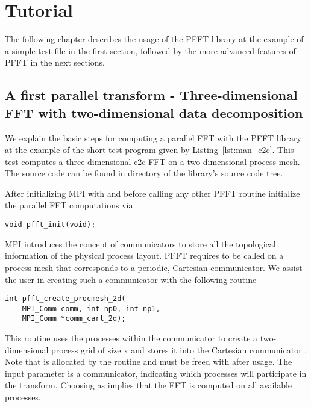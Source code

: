\chapter{Tutorial}\label{chap:tuto}

The following chapter describes the usage of the PFFT library at the example of a simple test file in the first section,
followed by the more advanced features of PFFT in the next sections.

\section{A first parallel transform - Three-dimensional FFT with two-dimensional data decomposition}
We explain the basic steps for computing a parallel FFT with the PFFT library at the example
of the short test program given by Listing~\ref{lst:man_c2c}. This test computes a three-dimensional c2c-FFT on
a two-dimensional process mesh. The source code  can be found in directory 
of the library's source code tree. 


After initializing MPI with  and before calling any other PFFT routine initialize
the parallel FFT computations via
\begin{lstlisting}
void pfft_init(void);
\end{lstlisting}
MPI introduces the concept of communicators to store all the topological information of the physical process layout.
PFFT requires to be called on a process mesh that corresponds to a periodic, Cartesian communicator.
We assist the user in creating such a communicator with the following routine
\begin{lstlisting}
int pfft_create_procmesh_2d(
    MPI_Comm comm, int np0, int np1,
    MPI_Comm *comm_cart_2d);
\end{lstlisting}
This routine uses the processes within the communicator  to create a two-dimensional process
grid of size  x  and stores it into the Cartesian communicator .
Note that  is allocated by the routine and must be freed with  after usage.
The input parameter  is a communicator, indicating which processes will participate in the transform.
Choosing  as  implies that the FFT is computed on all available processes.

